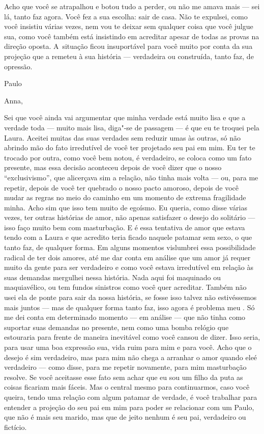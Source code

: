 Acho que você se atrapalhou e botou tudo a perder, ou não me amava mais
--- sei lá, tanto faz agora. Você fez a sua escolha: sair de casa. Não
te expulsei, como você insistiu várias vezes, nem vou te deixar sem
qualquer coisa que você julgue sua, como você também está insistindo em
acreditar apesar de todas as provas na direção oposta. A~situação ficou
insuportável para você muito por conta da sua projeção que a remeteu à
sua história --- verdadeira ou construída, tanto faz, de opressão.

\medskip{} 
\begin{flushright}Paulo\end{flushright}


\asterisc{}

Anna,

\medskip{} 

Sei que você ainda vai argumentar que minha verdade está muito lisa e
que a verdade toda --- muito mais lisa, diga"-se de passagem --- é que eu
te troquei pela Laura. Aceitei muitas das suas verdades sem reduzir umas
às outras, só não abrindo mão do fato irredutível de você ter projetado
seu pai em mim. Eu ter te trocado por outra, como você bem notou, é
verdadeiro, se coloca como um fato presente, mas essa decisão aconteceu
depois de você dizer que o nosso ``exclusivismo'', que alicerçava sim a
relação, não tinha mais volta --- ou, para me repetir, depois de você
ter quebrado o nosso pacto amoroso, depois de você mudar as regras no
meio do caminho em um momento de extrema fragilidade minha. Acho sim que
isso tem muito de egoísmo. Eu queria, como disse várias vezes, ter
outras histórias de amor, não apenas satisfazer o desejo do solitário
--- isso faço muito bem com masturbação. E é essa tentativa de amor que
estava tendo com a Laura e que acredito teria ficado naquele patamar sem
sexo, o que tanto faz, de qualquer forma. Em alguns momentos vislumbrei
essa possibilidade radical de ter dois amores, até me dar conta em
análise que um amor já requer muito da gente para ser verdadeiro e como
você estava irredutível em relação às suas demandas mergulhei nessa
história. Nada aqui foi maquinado ou maquiavélico, ou tem fundos
sinistros como você quer acreditar. Também não usei ela de ponte para
sair da nossa história, se fosse isso talvez não estivéssemos mais
juntos --- mas de qualquer forma tanto faz, isso agora é problema meu .
Só me dei conta em determinado momento --- em análise --- que não tinha
como suportar suas demandas no presente, nem como uma bomba relógio que
estouraria para frente de maneira inevitável como você cansou de dizer.
Isso seria, para usar uma boa expressão sua, vida ruim para mim e para
você. Acho que o desejo é sim verdadeiro, mas para mim não chega a
arranhar o amor quando eleé verdadeiro --- como disse, para me repetir
novamente, para mim masturbação resolve. Se você aceitasse esse fato sem
achar que eu sou um filho da puta as coisas ficariam mais fáceis. Mas o
central mesmo para continuarmos, caso você queira, tendo uma relação com
algum patamar de verdade, é você trabalhar para entender a projeção do
seu pai em mim para poder se relacionar com um Paulo, que não é mais seu
marido, mas que de jeito nenhum é seu pai, verdadeiro ou fictício.

